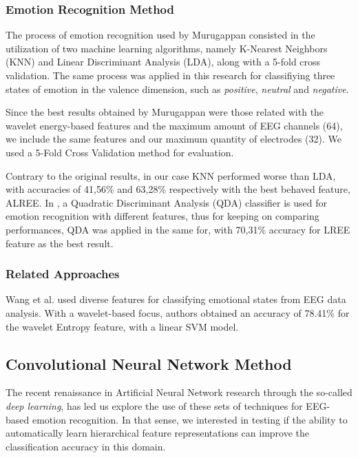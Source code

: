 \documentclass{sig-alternate}
\begin{document}
\subsubsection{Emotion Recognition Method}

The process of emotion recognition used by Murugappan consisted in the utilization of two machine learning algorithms, namely K-Nearest Neighbors (KNN) and Linear Discriminant Analysis (LDA), along with a 5-fold cross validation. The same process was applied in this research for classifiying three states of emotion in the valence dimension, such as \emph{positive}, \emph{neutral} and \emph{negative}.

Since the best results obtained by Murugappan were those related with the wavelet energy-based features and the maximum amount of EEG channels (64), we include the same features and our maximum quantity of electrodes (32). We used a 5-Fold Cross Validation method for evaluation.

Contrary to the original results, in our case KNN performed worse than LDA, with accuracies of 41,56\% and 63,28\% respectively with the best behaved feature, ALREE. In \cite{jenke2014feature}, a Quadratic Discriminant Analysis (QDA) classifier is used for emotion recognition with different features, thus for keeping on comparing performances, QDA was applied in the same for, with 70,31\% accuracy for LREE feature as the best result.

\subsubsection{Related Approaches}
Wang et al. \cite{wang2014} used diverse features for classifying emotional states from EEG data analysis. With a wavelet-based focus, authors obtained an accuracy of 78.41\% for the wavelet Entropy feature, with a linear SVM model.

\subsection{Convolutional Neural Network Method}

The recent renaissance in Artificial Neural Network research 
through the so-called \emph{deep learning}, has led us explore 
the use of these sets of techniques for EEG-based emotion 
recognition. In that sense, we interested in testing if the ability
to automatically learn  hierarchical feature representations can
improve the classification accuracy in this domain. 
\end{document}
